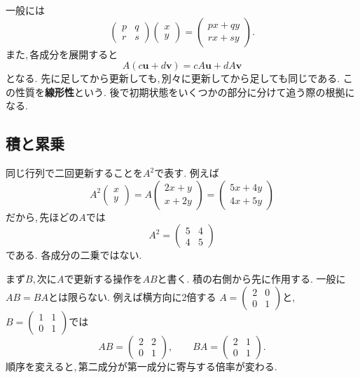一般には
\[
 \begin{pmatrix}p&q\\r&s\end{pmatrix}
 \begin{pmatrix}x\\y\end{pmatrix}
 =\begin{pmatrix}px+qy\\rx+sy\end{pmatrix}.
\]
また,\,各成分を展開すると
\[
 A(c\boldsymbol u+d\boldsymbol v)
 =cA\boldsymbol u+dA\boldsymbol v
\]
となる.
先に足してから更新しても,\,別々に更新してから足しても同じである.
この性質を\textbf{線形性}という.
後で初期状態をいくつかの部分に分けて追う際の根拠になる.

\subsection{積と累乗}

同じ行列で二回更新することを$A^2$で表す.
例えば
\[
 A^2\begin{pmatrix}x\\y\end{pmatrix}
 =A\begin{pmatrix}2x+y\\x+2y\end{pmatrix}
 =\begin{pmatrix}5x+4y\\4x+5y\end{pmatrix}
\]
だから,\,先ほどの$A$では
\[
 A^2=\begin{pmatrix}5&4\\4&5\end{pmatrix}
\]
である. 各成分の二乗ではない.

まず$B$,\,次に$A$で更新する操作を$AB$と書く.
積の右側から先に作用する.
一般に$AB=BA$とは限らない.
例えば横方向に2倍する
$A=\begin{pmatrix}2&0\\0&1\end{pmatrix}$と,
$B=\begin{pmatrix}1&1\\0&1\end{pmatrix}$では
\[
 AB=\begin{pmatrix}2&2\\0&1\end{pmatrix},
 \qquad BA=\begin{pmatrix}2&1\\0&1\end{pmatrix}.
\]
順序を変えると,\,第二成分が第一成分に寄与する倍率が変わる.

